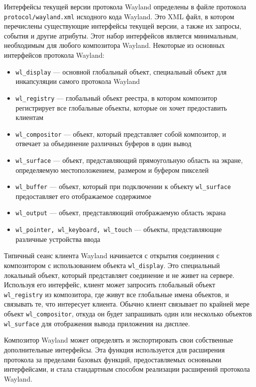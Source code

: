 Интерфейсы текущей версии протокола Wayland определены в файле протокола \texttt{protocol/wayland.xml} исходного кода Wayland. Это XML файл, в котором перечислены существующие интерфейсы текущей версии, а также их запросы, события и другие атрибуты. Этот набор интерфейсов является минимальным, необходимым для любого композитора Wayland. Некоторые из основных интерфейсов протокола Wayland:
\begin{itemize}
\item \texttt{wl\_display} --- основной глобальный объект, специальный объект для инкапсуляции самого протокола Wayland
\item \texttt{wl\_registry} --- глобальный объект реестра, в котором композитор регистрирует все глобальные объекты, которые он хочет предоставить клиентам
\item \texttt{wl\_compositor} --- объект, который представляет собой композитор, и отвечает за объединение различных буферов в один вывод
\item \texttt{wl\_surface} --- объект, представляющий прямоугольную область на экране, определяемую местоположением, размером и буфером пикселей
\item \texttt{wl\_buffer} --- объект, который при подключении к объекту \texttt{wl\_surface} предоставляет его отображаемое содержимое
\item \texttt{wl\_output} --- объект, представляющий отображаемую область экрана
\item \texttt{wl\_pointer, wl\_keyboard, wl\_touch} --- объекты, представляющие различные устройства ввода
\end{itemize} 

Типичный сеанс клиента Wayland начинается с открытия соединения с композитором с использованием объекта \texttt{wl\_display}. Это специальный локальный объект, который представляет соединение и не живет на сервере. Используя его интерфейс, клиент может запросить глобальный объект \texttt{wl\_registry} из композитора, где живут все глобальные имена объектов, и связывать те, что интересует клиента. Обычно клиент связывает по крайней мере объект \texttt{wl\_compositor}, откуда он будет запрашивать один или несколько объектов \texttt{wl\_surface} для отображения вывода приложения на дисплее.

Композитор Wayland может определять и экспортировать свои собственные дополнительные интерфейсы. Эта функция используется для расширения протокола за пределами базовых функций, предоставляемых основными интерфейсами, и стала стандартным способом реализации расширений протокола Wayland.

